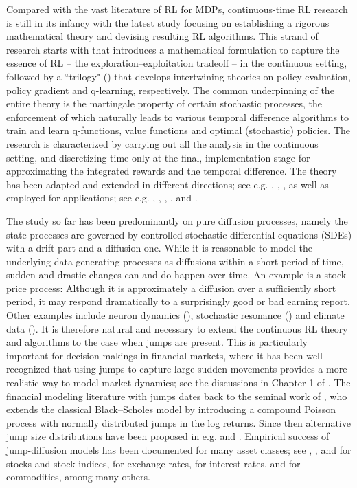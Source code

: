 \documentclass[11pt]{article}
\newcommand{\1}{\mathbbm{1}}
\begin{document}
Compared with the vast literature of RL for MDPs, continuous-time RL research is still in its infancy with the latest study focusing on establishing a rigorous mathematical theory and devising resulting RL algorithms. This strand of research starts with \cite{wang2020reinforcement} that introduces  a mathematical formulation to capture the essence of RL -- the exploration--exploitation tradeoff -- in the continuous setting, followed by a ``trilogy" (\citealt{jia2022policy, jia2022policyb, jia2022q}) that develops intertwining theories on policy evaluation, policy gradient and q-learning, respectively. The common underpinning of the entire theory is the martingale property of certain stochastic processes, the enforcement of which naturally leads to various temporal difference algorithms to train and learn q-functions, value functions and optimal (stochastic) policies. The research is characterized by carrying out all the analysis in the continuous setting, and discretizing time only at the final, implementation stage for approximating the integrated rewards and the temporal difference. The theory has been adapted and extended in different directions; see e.g. \cite{RZ2021}, \cite{guo2022entropy}, \cite{dai2023learning}, as well as employed for applications; see e.g. \cite{wang2020continuous}, \cite{huang2022achieving}, \cite{gao2022state}, \cite{wang2023reinforcement}, and \cite{wu2024reinforcement}.

The study so far has been predominantly on pure diffusion processes, namely the state processes are governed by controlled stochastic differential equations (SDEs) with a drift part and a diffusion one. While it is reasonable to model the underlying data generating processes as diffusions within a short period of time, sudden and drastic changes can and do happen
over time. An example is a stock price process: Although it is approximately a diffusion over a sufficiently short period, it may respond dramatically to a surprisingly good or bad earning report. Other examples include neuron dynamics (\citealt{GS1997}),
stochastic resonance (\citealt{GHJM1998})
and climate data (\citealt{Goswami2018}).
It is therefore natural and necessary to extend the continuous RL theory and algorithms to the case when jumps are present.
This is particularly important for decision makings in financial markets, where it has been well recognized that using jumps to capture large sudden movements provides a more realistic way to model market dynamics; see the discussions in Chapter 1 of \cite{tankov2004financial}. The financial modeling literature with jumps dates back to the seminal work of \cite{merton1976option}, who extends the classical Black--Scholes model by introducing a compound Poisson process with normally distributed jumps in the log returns. Since then alternative jump size distributions have been proposed in e.g. \cite{kou2002jump} and \cite{cai2011option}. Empirical success of jump-diffusion models has been documented for many asset classes; see \cite{bates1991crash}, \cite{andersen2002empirical}, and \cite{ait2012testing} for stocks and stock indices, \cite{bates1996jumps} for exchange rates, \cite{das2002surprise} for interest rates, and \cite{li2014time} for commodities, among many others.
\end{document}
